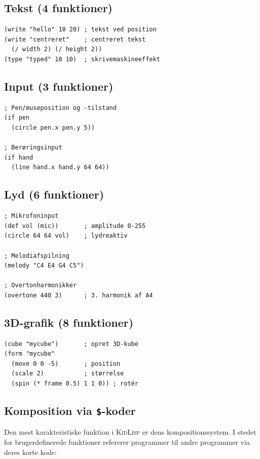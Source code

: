 \documentclass[10pt,letterpaper,twocolumn]{article}
\newcommand{\kl}{\textsc{KidLisp}}
\begin{document}
\subsection{Tekst (4 funktioner)}

\begin{lstlisting}
(write "hello" 10 20) ; tekst ved position
(write "centreret"    ; centreret tekst
  (/ width 2) (/ height 2))
(type "typed" 10 10)  ; skrivemaskineeffekt
\end{lstlisting}

\subsection{Input (3 funktioner)}

\begin{lstlisting}
; Pen/museposition og -tilstand
(if pen
  (circle pen.x pen.y 5))

; Berøringsinput
(if hand
  (line hand.x hand.y 64 64))
\end{lstlisting}

\subsection{Lyd (6 funktioner)}

\begin{lstlisting}
; Mikrofoninput
(def vol (mic))       ; amplitude 0-255
(circle 64 64 vol)    ; lydreaktiv

; Melodiafspilning
(melody "C4 E4 G4 C5")

; Overtonharmonikker
(overtone 440 3)      ; 3. harmonik af A4
\end{lstlisting}

\subsection{3D-grafik (8 funktioner)}

\begin{lstlisting}
(cube "mycube")       ; opret 3D-kube
(form "mycube"
  (move 0 0 -5)       ; position
  (scale 2)           ; størrelse
  (spin (* frame 0.5) 1 1 0)) ; rotér
\end{lstlisting}

\subsection{Komposition via \texttt{\$}-koder}

Den mest karakteristiske funktion i \kl{} er dens kompositionssystem. I stedet for brugerdefinerede funktioner refererer programmer til andre programmer via deres korte kode:
\end{document}
